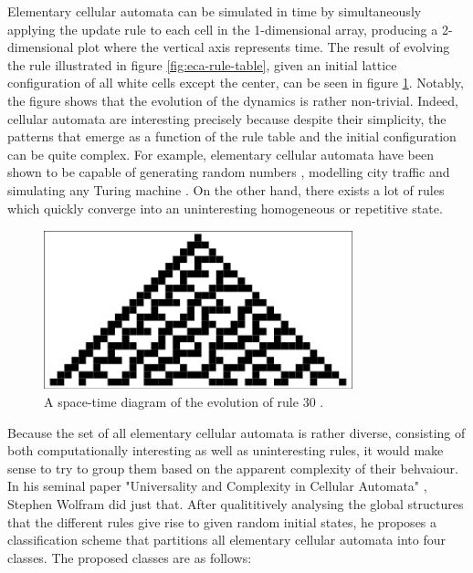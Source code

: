 \documentclass[12pt]{article}
\begin{document}
Elementary cellular automata can be simulated in time by simultaneously applying the update rule to each cell in the 1-dimensional array, producing a 2-dimensional plot where the vertical axis represents time. The result of evolving the rule illustrated in figure \ref{fig:eca-rule-table}, given an initial lattice configuration of all white cells except the center, can be seen in figure \ref{fig:eca-rule-dynamics}. Notably, the figure shows that the evolution of the dynamics is rather non-trivial. Indeed, cellular automata are interesting precisely because despite their simplicity, the patterns that emerge as a function of the rule table and the initial configuration can be quite complex. For example, elementary cellular automata have been shown to be capable of generating random numbers \cite{eca-random-gen}, modelling city traffic \cite{eca-city-traffic} and simulating any Turing machine \cite{eca-universal}. On the other hand, there exists a lot of rules which quickly converge into an uninteresting homogeneous or repetitive state. 

\begin{figure} [!h]
\begin{center}
\includegraphics[width=0.8\textwidth]{eca-dynamics-example}
\caption{A space-time diagram of the evolution of rule 30 \cite{weisstein-eca}.}
\label{fig:eca-rule-dynamics}
\end{center}
\end{figure} 

Because the set of all elementary cellular automata is rather diverse, consisting of both computationally interesting as well as uninteresting rules, it would make sense to try to group them based on the apparent complexity of their behvaiour. In his seminal paper "Universality and Complexity in Cellular Automata" \cite{wolfram-classification}, Stephen Wolfram did just that. After qualititively analysing the global structures that the different rules give rise to given random initial states, he proposes a classification scheme that partitions all elementary cellular automata into four classes. The proposed classes are as follows:
\end{document}
